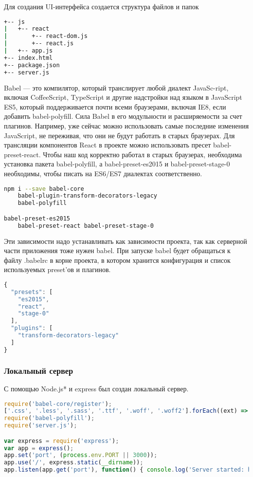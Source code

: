 Для создания UI-интерфейса создается структура файлов и папок

\begin{lstlisting}[language=bash, label=lst:domain:typescript]
+-- js 
|   +-- react 
|       +-- react-dom.js 
|       +-- react.js 
|   +-- app.js 
+-- index.html 
+-- package.json 
+-- server.js
\end{lstlisting}

Babel\cite{babel} — это компилятор, который транслирует любой диалект JavaSc-ript, включая CoffeeScript, TypeScript и другие надстройки над языком в 
JavaScript ES5, который поддерживается почти всеми браузерами, включая IE8, если добавить babel-polyfill. Сила Babel в его модульности и расширяемости 
за счет плагинов. Например, уже сейчас можно использовать самые последние изменения JavaScript, не переживая, что они не будут работать в старых браузерах.
Для трансляции компонентов React в проекте можно использовать пресет babel-preset-react. Чтобы наш код корректно работал в старых браузерах, необходима установка 
пакета babel-polyfill, а babel-preset-es2015 и babel-preset-stage-0 необходимы, чтобы писать на ES6/ES7 диалектах соответственно.

\begin{lstlisting}[language=bash, label=lst:domain:typescript]
npm i --save babel-core
    babel-plugin-transform-decorators-legacy
    babel-polyfill 

babel-preset-es2015
    babel-preset-react babel-preset-stage-0
\end{lstlisting}

Эти зависимости надо устанавливать как зависимости проекта, так как серверной части приложения тоже нужен babel.
При запуске babel будет обращаться к файлу .babelrc в корне проекта, в котором хранится конфигурация и список используемых preset'ов и плагинов.

\begin{lstlisting}[language=TypeScript, label=lst:domain:typescript]
{
  "presets": [
    "es2015",
    "react",
    "stage-0"
  ],
  "plugins": [
    "transform-decorators-legacy"
  ]
}
\end{lstlisting}

\subsubsection{Локальный сервер} 

С помощью Node.js* и express был создан локальный сервер. 

\begin{lstlisting}[language=TypeScript, label=lst:domain:typescript]
require('babel-core/register');
['.css', '.less', '.sass', '.ttf', '.woff', '.woff2'].forEach((ext) => require.extensions[ext] = () => {});
require('babel-polyfill');
require('server.js'); 

var express = require('express'); 
var app = express(); 
app.set('port', (process.env.PORT || 3000)); 
app.use('/', express.static(__dirname)); 
app.listen(app.get('port'), function() { console.log('Server started: http://localhost:' + app.get('port') + '/'); });
\end{lstlisting}

